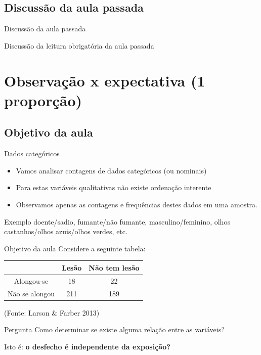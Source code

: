\documentclass{beamer}
\begin{document}
\subsection{Discussão da aula passada}

\begin{frame}{Discussão da aula passada}
  \begin{block}{}
    Discussão da leitura obrigatória da aula passada
  \end{block}
\end{frame}

\section[1 amostra]{Observação x expectativa (1 proporção)}

\subsection{Objetivo da aula}

\begin{frame}{Dados categóricos}
  \begin{itemize}
  \item Vamos analisar contagens de dados categóricos (ou nominais)
  \item Para estas variáveis qualitativas não existe ordenação interente
  \item Observamos apenas as contagens e frequências destes dados em
    uma amostra.
  \end{itemize}
  \begin{exampleblock}{Exemplo}
    doente/sadio, fumante/não fumante, masculino/feminino, olhos
    castanhos/olhos azuis/olhos verdes, etc.
  \end{exampleblock}
\end{frame}

\begin{frame}{Objetivo da aula}
  \small
  Considere a seguinte tabela:
  \begin{block}{}
    \footnotesize
    \begin{tabular}{c|c|c}
                 & Lesão & Não tem lesão\\
      \hline
      Alongou-se & 18 & 22\\
      \hline
      Não se alongou & 211 & 189\\
    \end{tabular}

    \bigskip
    {\hfill \scriptsize (Fonte: Larson \& Farber 2013)}
  \end{block}
  \vfill
  \begin{block}{Pergunta}
    Como determinar se existe alguma relação entre as variáveis?

    \bigskip
    \small
    Isto é: {\bf o desfecho é independente da exposição?}
  \end{block}
\end{frame}
\end{document}
